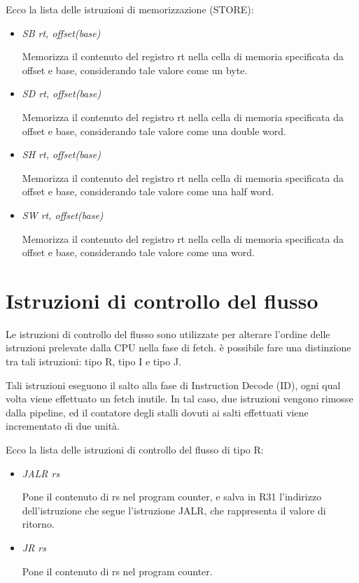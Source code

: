 \documentclass[letterpaper,10pt,italian]{sphinxmanual}
\begin{document}
Ecco la lista delle istruzioni di memorizzazione (STORE):
\begin{itemize}
\item {} 
\emph{SB rt, offset(base)}

Memorizza il contenuto del registro rt nella cella di memoria specificata da
offset e base, considerando tale valore come un byte.

\item {} 
\emph{SD rt, offset(base)}

Memorizza il contenuto del registro rt nella cella di memoria specificata da
offset e base, considerando tale valore come una double word.

\item {} 
\emph{SH rt, offset(base)}

Memorizza il contenuto del registro rt nella cella di memoria specificata da
offset e base, considerando tale valore come una half word.

\item {} 
\emph{SW rt, offset(base)}

Memorizza il contenuto del registro rt nella cella di memoria specificata da
offset e base, considerando tale valore come una word.

\end{itemize}


\section{Istruzioni di controllo del flusso}
\label{instructions:istruzioni-di-controllo-del-flusso}
Le istruzioni di controllo del flusso sono utilizzate per alterare l'ordine
delle istruzioni prelevate dalla CPU nella fase di fetch. è possibile fare una
distinzione tra tali istruzioni: tipo R, tipo I e tipo J.

Tali istruzioni eseguono il salto alla fase di Instruction Decode (ID), ogni
qual volta viene effettuato un fetch inutile. In tal caso, due istruzioni
vengono rimosse dalla pipeline, ed il contatore degli stalli dovuti ai salti
effettuati viene incrementato di due unità.

Ecco la lista delle istruzioni di controllo del flusso di tipo R:
\begin{itemize}
\item {} 
\emph{JALR rs}

Pone il contenuto di rs nel program counter, e salva in R31 l'indirizzo
dell'istruzione che segue l'istruzione JALR, che rappresenta il valore di
ritorno.

\item {} 
\emph{JR rs}

Pone il contenuto di rs nel program counter.

\end{itemize}
\end{document}
